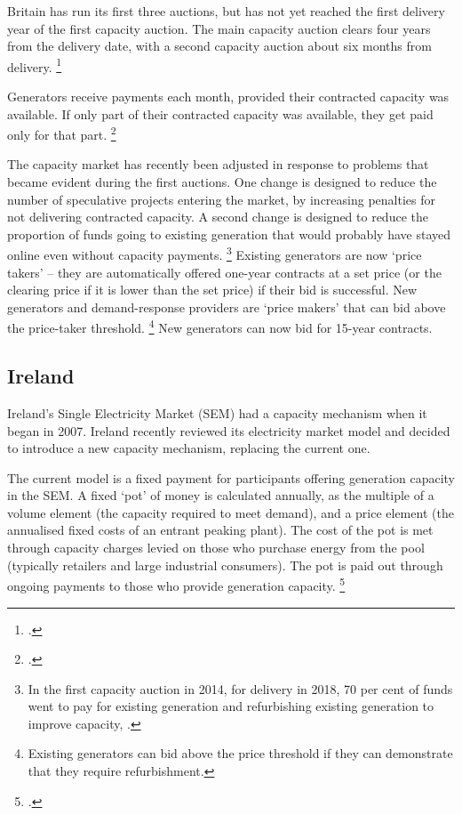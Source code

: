 \documentclass[FrontPage]{grattan}
\begin{document}
Britain has run its first three auctions, but has not yet reached the first delivery year of the first capacity auction. The main capacity auction clears four years from the delivery date, with a second capacity auction about six months from delivery.%
\footcite{NationalGrid2016AuctionResults}

Generators receive payments each month, provided their contracted capacity was available. If only part of their contracted capacity was available, they get paid only for that part.%
\footcite{Ofgem2016CapacityMarketRules}

The capacity market has recently been adjusted in response to problems that became evident during the first auctions. One change is designed to reduce the number of speculative projects entering the market, by increasing penalties for not delivering contracted capacity. A second change is designed to reduce the proportion of funds going to existing generation that would probably have stayed online even without capacity payments.%
\footnote{In the first capacity auction in 2014, for delivery in 2018, 70 per cent of funds went to pay for existing generation and refurbishing existing generation to improve capacity, \textcite{NationalGrid2014AuctionResults}.}
Existing generators are now `price takers' -- they are automatically offered one-year contracts at a set price (or the clearing price if it is lower than the set price) if their bid is successful. New generators and demand-response providers are `price makers' that can bid above the price-taker threshold.%
\footnote{Existing generators can bid above the price threshold if they can demonstrate that they require refurbishment.}
New generators can now bid for 15-year contracts. 

\subsection{Ireland}\label{subsec:appendix-ireland} 
Ireland's Single Electricity Market (SEM) had a capacity mechanism when it began in 2007. Ireland recently reviewed its electricity market model and decided to introduce a new capacity mechanism, replacing the current one. 

The current model is a fixed payment for participants offering generation capacity in the SEM\@. A fixed `pot' of money is calculated annually, as the multiple of a volume element (the capacity required to meet demand), and a price element (the annualised fixed costs of an entrant peaking plant). The cost of the pot is met through capacity charges levied on those who purchase energy from the pool (typically retailers and large industrial consumers). The pot is paid out through ongoing payments to those who provide generation capacity.%
\footcite{SEM2017CapacityPayment}
\end{document}
